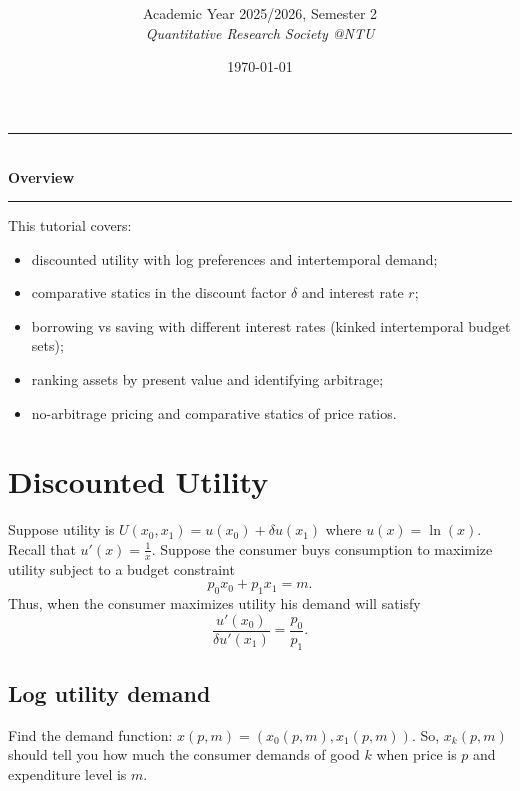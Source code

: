 \documentclass[12pt]{article}
\title{
\CourseCode \CourseName \\[0.3em]
\large \DocType
}
\author{
  Academic Year 2025/2026, Semester 2 \\[0.25em]
  \textit{Quantitative Research Society @NTU}
}
\date{\today}
\begin{document}
\maketitle
\thispagestyle{plainfirst}
\pagestyle{main}
\bigskip

\begin{center}
  \rule{0.8\textwidth}{0.4pt}\\[4pt]
  \textbf{Overview}\\[2pt]
  \rule{0.8\textwidth}{0.4pt}
\end{center}

\noindent
This tutorial covers:
\begin{itemize}[leftmargin=*]
  \item discounted utility with log preferences and intertemporal demand;
  \item comparative statics in the discount factor \(\delta\) and interest rate \(r\);
  \item borrowing vs saving with different interest rates (kinked intertemporal budget sets);
  \item ranking assets by present value and identifying arbitrage;
  \item no-arbitrage pricing and comparative statics of price ratios.
\end{itemize}

\bigskip

\newpage
\section{Discounted Utility}

Suppose utility is \(U(x_0,x_1)=u(x_0)+\delta u(x_1)\) where \(u(x)=\ln(x)\).
Recall that \(u'(x)=\frac{1}{x}\).
Suppose the consumer buys consumption to maximize utility subject to a budget constraint
\[
p_0x_0+p_1x_1=m.
\]
Thus, when the consumer maximizes utility his demand will satisfy
\[
\frac{u'(x_0)}{\delta u'(x_1)}=\frac{p_0}{p_1}.
\]

\subsection{Log utility demand}
Find the demand function: \(x(p,m)=(x_0(p,m),x_1(p,m))\). So, \(x_k(p,m)\) should tell you
how much the consumer demands of good \(k\) when price is \(p\) and expenditure level is
\(m\).
\end{document}
